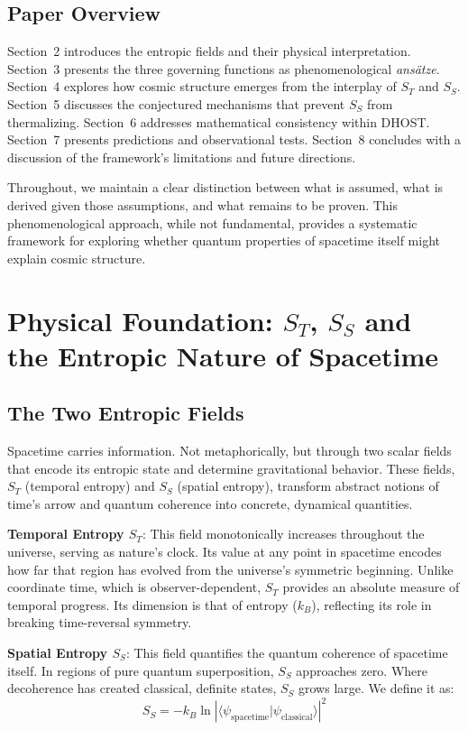 \documentclass[12pt]{article}
\begin{document}
\subsection{Paper Overview}

Section~2 introduces the entropic fields and their physical interpretation. Section~3 presents the three governing functions as phenomenological \textit{ans\"atze}. Section~4 explores how cosmic structure emerges from the interplay of $S_T$ and $S_S$. Section~5 discusses the conjectured mechanisms that prevent $S_S$ from thermalizing. Section~6 addresses mathematical consistency within DHOST. Section~7 presents predictions and observational tests. Section~8 concludes with a discussion of the framework's limitations and future directions.

Throughout, we maintain a clear distinction between what is assumed, what is derived given those assumptions, and what remains to be proven. This phenomenological approach, while not fundamental, provides a systematic framework for exploring whether quantum properties of spacetime itself might explain cosmic structure.

\section{Physical Foundation: $S_T$, $S_S$ and the Entropic Nature of Spacetime}

\subsection{The Two Entropic Fields}

Spacetime carries information. Not metaphorically, but through two scalar fields that encode its entropic state and determine gravitational behavior. These fields, $S_T$ (temporal entropy) and $S_S$ (spatial entropy), transform abstract notions of time's arrow and quantum coherence into concrete, dynamical quantities.

\textbf{Temporal Entropy $S_T$}: This field monotonically increases throughout the universe, serving as nature's clock. Its value at any point in spacetime encodes how far that region has evolved from the universe's symmetric beginning. Unlike coordinate time, which is observer-dependent, $S_T$ provides an absolute measure of temporal progress. Its dimension is that of entropy ($k_B$), reflecting its role in breaking time-reversal symmetry.

\textbf{Spatial Entropy $S_S$}: This field quantifies the quantum coherence of spacetime itself. In regions of pure quantum superposition, $S_S$ approaches zero. Where decoherence has created classical, definite states, $S_S$ grows large. We define it as:
\begin{equation}
S_S = -k_B \ln \left| \langle \psi_{\textrm{spacetime}} | \psi_{\textrm{classical}} \rangle \right|^2
\end{equation}
\end{document}
